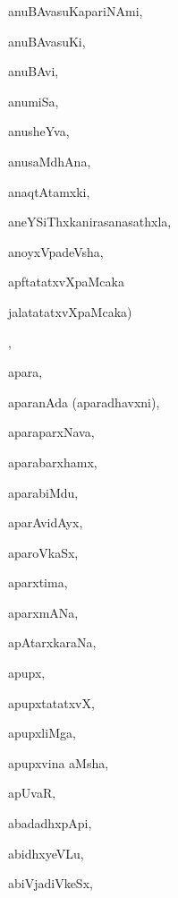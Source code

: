\begin{multicols}{3}
{\noindent
{anuBAvasuKapariNAmi}, \pageref{anuBAvasuKapariNAmi}

\noindent
{anuBAvasuKi}, \pageref{anuBAvasuKi}

\noindent
{anuBAvi}, \pageref{anuBAvi}

\noindent
{anumiSa}, \pageref{anumiSa}

\noindent
{anusheYva}, \pageref{anusheYva}

\noindent
{anusaMdhAna}, \pageref{anusaMdhAna}

\noindent
{anaqtAtamxki}, \pageref{anaqtAtamxki}

\noindent
{aneYSiThxkanirasanasathxla}, \pageref{aneYSiThxkanirasanasathxla}

\noindent
{anoyxVpadeVsha}, \pageref{anoyxVpadeVsha}

\noindent
{apftatatxvXpaMcaka 

\noindent
\qquad jalatatatxvXpaMcaka)}, \pageref{apftatatxvXpaMcaka (jalatatatxvXpaMcaka)}

\noindent
{apara}, \pageref{apara}

\noindent
{aparanAda (aparadhavxni)}, \pageref{aparanAda (aparadhavxni)}

\noindent
{aparaparxNava}, \pageref{aparaparxNava}

\noindent
{aparabarxhamx}, \pageref{aparabarxhamx}

\noindent
{aparabiMdu}, \pageref{aparabiMdu}

\noindent
{aparAvidAyx}, \pageref{aparAvidAyx}

\noindent
{aparoVkaSx}, \pageref{aparoVkaSx}

\noindent
{aparxtima}, \pageref{aparxtima}

\noindent
{aparxmANa}, \pageref{aparxmANa}

\noindent
{apAtarxkaraNa}, \pageref{apAtarxkaraNa}

\noindent
{apupx}, \pageref{apupx}

\noindent
{apupxtatatxvX}, \pageref{apupxtatatxvX}

\noindent
{apupxliMga}, \pageref{apupxliMga}

\noindent
{apupxvina aMsha}, \pageref{apupxvina aMsha}

\noindent
{apUvaR}, \pageref{apUvaR}

\noindent
{abadadhxpApi}, \pageref{abadadhxpApi}

\noindent
{abidhxyeVLu}, \pageref{abidhxyeVLu}

\noindent
{abiVjadiVkeSx}, \pageref{abiVjadiVkeSx}

}
\end{multicols}
